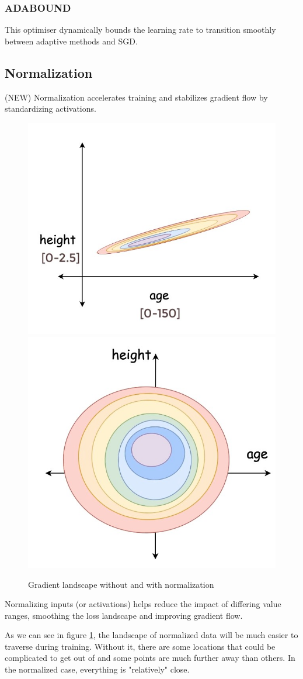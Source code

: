 \documentclass{article}
\begin{document}
\subsubsection{ADABOUND}
This optimiser dynamically bounds the learning rate to transition smoothly between adaptive methods and SGD.

\subsection{Normalization} (NEW)
Normalization accelerates training and stabilizes gradient flow by standardizing activations.

\begin{figure}
    \centering
    \includegraphics[width=0.4\linewidth]{graphics/S3Optimisation/batchnorm_exp01.jpg}
    \includegraphics[width=0.4\linewidth]{graphics/S3Optimisation/batchnorm_exp02.jpg}
    \caption{Gradient landscape without and with normalization}
    \label{fig:enter-label}
\end{figure}

Normalizing inputs (or activations) helps reduce the impact of differing value ranges, smoothing the loss landscape and improving gradient flow.

As we can see in figure \ref{fig:enter-label}, the landscape of normalized data will be much easier to traverse during training. Without it, there are some locations that could be complicated to get out of and some points are much further away than others. In the normalized case, everything is "relatively" close.
\end{document}
